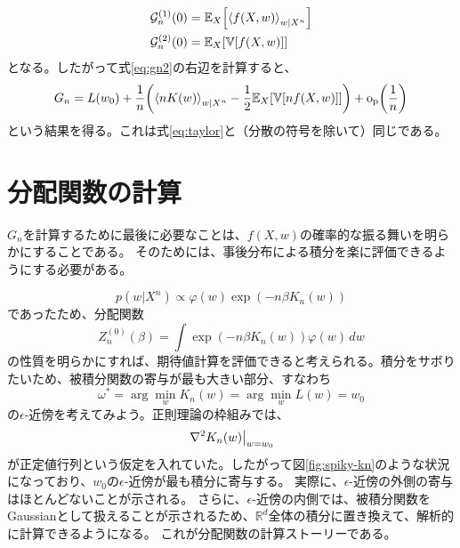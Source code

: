 \documentclass[dvipdfmx]{jsarticle}
\begin{document}
\begin{align}
    \mathcal{G}_n^{(1)}(0) &= \mathbb{E}_X\qty[\ev{f(X,w)}_{w|X^n}] \\
    \mathcal{G}_n^{(2)}(0) &= \mathbb{E}_X\qty[\mathbb{V}[f(X,w)]] \\
\end{align}
となる。したがって式\eqref{eq:gn2}の右辺を計算すると、
\begin{equation}
    G_n = L(w_0) + \frac{1}{n}\qty(\ev{nK(w)}_{w|X^n} - \frac{1}{2}\mathbb{E}_X\qty[\mathbb{V}[nf(X,w)]]) + \mathrm{o_p}\qty(\frac{1}{n})
\end{equation}
という結果を得る。これは式\eqref{eq:taylor}と（分散の符号を除いて）同じである。

\section{分配関数の計算}
$G_n$を計算するために最後に必要なことは、$f(X,w)$の確率的な振る舞いを明らかにすることである。
そのためには、事後分布による積分を楽に評価できるようにする必要がある。

\begin{equation}
    p(w|X^n) \propto \varphi(w)\exp(-n\beta K_n(w))
\end{equation}
であったため、分配関数
\begin{equation}
    Z_n^{(0)}(\beta) = \int\exp(-n\beta K_n(w))\varphi(w)\,dw
\end{equation}
の性質を明らかにすれば、期待値計算を評価できると考えられる。積分をサボりたいため、被積分関数の寄与が最も大きい部分、すなわち
\begin{equation}
    \omega^* = \arg\min_{w} K_n(w) = \arg\min_{w} L(w) = w_0
\end{equation}
の$\epsilon\text{-}$近傍を考えてみよう。正則理論の枠組みでは、
\begin{equation}
    \left.\laplacian{K_n(w)}\right|_{w=w_0}
\end{equation}
が正定値行列という仮定を入れていた。したがって図\ref{fig:spiky-kn}のような状況になっており、$w_0$の$\epsilon\text{-}$近傍が最も積分に寄与する。
実際に、$\epsilon\text{-}$近傍の外側の寄与はほとんどないことが示される。
さらに、$\epsilon\text{-}$近傍の内側では、被積分関数をGaussianとして扱えることが示されるため、$\mathbb{R}^d$全体の積分に置き換えて、解析的に計算できるようになる。
これが分配関数の計算ストーリーである。
\end{document}
